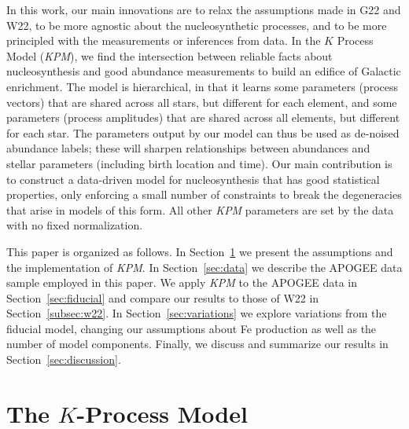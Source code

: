 \documentclass[modern]{aastex631}
\newcommand{\name}{\textsl{KPM}}
\begin{document}
In this work, our main innovations are to relax the assumptions made in G22 and W22, to be more agnostic about the nucleosynthetic processes, and to be more principled with the measurements or inferences from data.
In the $K$ Process Model (\name{}), we find the intersection between reliable facts about nucleosynthesis and good abundance measurements to build an edifice of Galactic enrichment.
The model is hierarchical, in that it learns some parameters (process vectors) that are shared across all stars, but different for each element, and some parameters (process amplitudes) that are shared across all elements, but different for each star.
The parameters output by our model can thus be used as de-noised abundance labels; these will sharpen relationships between abundances and stellar parameters (including birth location and time). Our main contribution is to construct a data-driven model for nucleosynthesis that has good statistical properties, only enforcing a small number of constraints to break the degeneracies that arise in models of this form. All other \name{} parameters are set by the data with no fixed normalization.

This paper is organized as follows. In Section~\ref{sec:model} we present the assumptions and the implementation of \name{}. In Section~\ref{sec:data} we describe the APOGEE data sample employed in this paper.  We apply \name{} to the APOGEE data in Section~\ref{sec:fiducial} and compare our results to those of W22 in Section~\ref{subsec:w22}. In Section~\ref{sec:variations} we explore variations from the fiducial model, changing our assumptions about Fe production as well as the number of model components. Finally, we discuss and summarize our results in Section~\ref{sec:discussion}.

\section{The $K$-Process Model}\label{sec:model}
\end{document}
